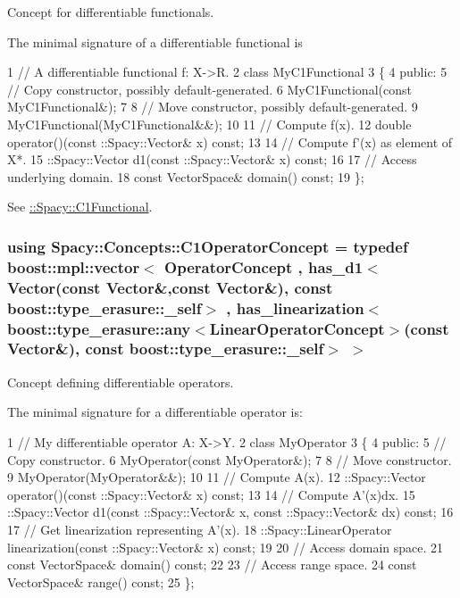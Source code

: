Concept for differentiable functionals. 

\label{group__ConceptGroup_ga205b55d8291e0f2e143f116cf78bc54f_C1FunctionalConceptAnchor}%
\hypertarget{group__ConceptGroup_ga205b55d8291e0f2e143f116cf78bc54f_C1FunctionalConceptAnchor}{}%
The minimal signature of a differentiable functional is 
\begin{DoxyCode}
1 // A differentiable functional f: X->R.
2 class MyC1Functional
3 \{
4 public:
5   // Copy constructor, possibly default-generated.
6   MyC1Functional(const MyC1Functional&);
7 
8   // Move constructor, possibly default-generated.
9   MyC1Functional(MyC1Functional&&);
10 
11   // Compute f(x).
12   double operator()(const ::Spacy::Vector& x) const;
13 
14   // Compute f'(x) as element of X*.
15   ::Spacy::Vector d1(const ::Spacy::Vector& x) const;
16 
17   // Access underlying domain.
18   const VectorSpace& domain() const;
19 \};
\end{DoxyCode}


See \hyperlink{group__SpacyGroup_gaa7cb8ef6c287b0af0352d3dd0eb9f200_C1FunctionalAnchor}{\+:\+:Spacy\+:\+:C1\+Functional}. \hypertarget{group__ConceptGroup_ga14a12c741dc237e32862fa4bc315451b_ga14a12c741dc237e32862fa4bc315451b}{}
\subsubsection[{C1\+Operator\+Concept}]{\setlength{\rightskip}{0pt plus 5cm}using {\bf Spacy\+::\+Concepts\+::\+C1\+Operator\+Concept} = typedef boost\+::mpl\+::vector$<$ {\bf Operator\+Concept} , has\+\_\+d1$<${\bf Vector}(const {\bf Vector}\&,const {\bf Vector}\&), const boost\+::type\+\_\+erasure\+::\+\_\+self$>$ , has\+\_\+linearization$<$boost\+::type\+\_\+erasure\+::any$<${\bf Linear\+Operator\+Concept}$>$(const {\bf Vector}\&), const boost\+::type\+\_\+erasure\+::\+\_\+self$>$ $>$}\label{group__ConceptGroup_ga14a12c741dc237e32862fa4bc315451b_ga14a12c741dc237e32862fa4bc315451b}


Concept defining differentiable operators. 

\label{group__ConceptGroup_ga14a12c741dc237e32862fa4bc315451b_C1OperatorConceptAnchor}%
\hypertarget{group__ConceptGroup_ga14a12c741dc237e32862fa4bc315451b_C1OperatorConceptAnchor}{}%
The minimal signature for a differentiable operator is\+: 
\begin{DoxyCode}
1 // My differentiable operator A: X->Y.
2 class MyOperator
3 \{
4 public:
5   // Copy constructor.
6   MyOperator(const MyOperator&);
7 
8   // Move constructor.
9   MyOperator(MyOperator&&);
10 
11   // Compute A(x).
12   ::Spacy::Vector operator()(const ::Spacy::Vector& x) const;
13 
14   // Compute A'(x)dx.
15   ::Spacy::Vector d1(const ::Spacy::Vector& x, const ::Spacy::Vector& dx) const;
16 
17   // Get linearization representing A'(x).
18  ::Spacy::LinearOperator linearization(const ::Spacy::Vector& x) const;
19 
20   // Access domain space.
21   const VectorSpace& domain() const;
22 
23   // Access range space.
24   const VectorSpace& range() const;
25 \};
\end{DoxyCode}


